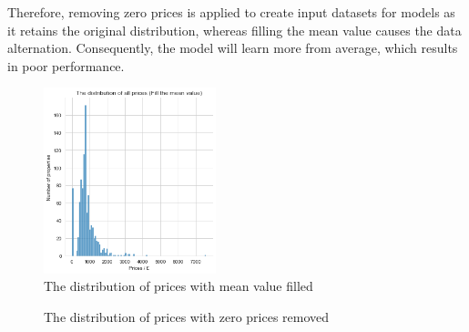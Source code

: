 \documentclass[12pt,twoside]{report}
\begin{document}
Therefore, removing zero prices is applied to create input datasets for models as it retains the original distribution, whereas filling the mean value causes the data alternation. Consequently, the model will learn more from average, which results in poor performance. 

\begin{figure}[h]
	\centering
	\includegraphics[width=5cm]{price_all_mean}
	\caption{The distribution of prices with mean value filled}
	\label{price_filled}
\end{figure}

\begin{figure}[h]
	\centering
	\caption{The distribution of prices with zero prices removed}
	\label{price_removed}
\end{figure}
\end{document}
